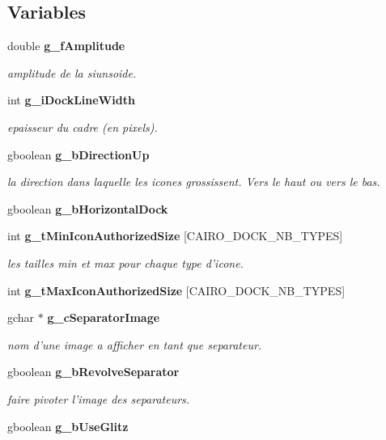 \subsection*{Variables}
\begin{CompactItemize}
\item 
double {\bf g\_\-f\-Amplitude}
\begin{CompactList}\small\item\em amplitude de la siunsoide. \item\end{CompactList}\item 
int {\bf g\_\-i\-Dock\-Line\-Width}
\begin{CompactList}\small\item\em epaisseur du cadre (en pixels). \item\end{CompactList}\item 
gboolean {\bf g\_\-b\-Direction\-Up}
\begin{CompactList}\small\item\em la direction dans laquelle les icones grossissent. Vers le haut ou vers le bas. \item\end{CompactList}\item 
gboolean {\bf g\_\-b\-Horizontal\-Dock}
\item 
int {\bf g\_\-t\-Min\-Icon\-Authorized\-Size} [CAIRO\_\-DOCK\_\-NB\_\-TYPES]
\begin{CompactList}\small\item\em les tailles min et max pour chaque type d'icone. \item\end{CompactList}\item 
int {\bf g\_\-t\-Max\-Icon\-Authorized\-Size} [CAIRO\_\-DOCK\_\-NB\_\-TYPES]
\item 
gchar $\ast$ {\bf g\_\-c\-Separator\-Image}
\begin{CompactList}\small\item\em nom d'une image a afficher en tant que separateur. \item\end{CompactList}\item 
gboolean {\bf g\_\-b\-Revolve\-Separator}
\begin{CompactList}\small\item\em faire pivoter l'image des separateurs. \item\end{CompactList}\item 
gboolean {\bf g\_\-b\-Use\-Glitz}
\end{CompactItemize}


